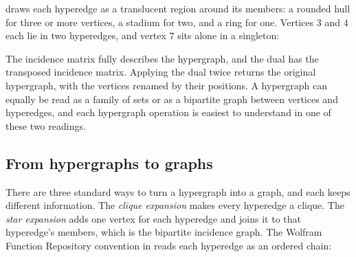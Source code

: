  draws each hyperedge as a translucent region around its
members: a rounded hull for three or more vertices, a stadium for two, and a
ring for one. Vertices \(3\) and \(4\) each lie in two hyperedges, and vertex
\(7\) sits alone in a singleton:



The incidence matrix fully describes the hypergraph, and the dual has the
transposed incidence matrix. Applying the dual twice returns the original
hypergraph, with the vertices renamed by their positions. A hypergraph can equally be read as a family of sets or as a
bipartite graph between vertices and hyperedges, and each hypergraph operation
is easiest to understand in one of these two readings.


\subsection{From hypergraphs to graphs}
\label{ssec:hyp-expansions}

There are three standard ways to turn a hypergraph into a graph, and each keeps
different information. The \emph{clique expansion} makes every hyperedge a
clique. The \emph{star expansion} adds one vertex for each hyperedge and joins
it to that hyperedge's members, which is the bipartite incidence graph. The
Wolfram Function Repository convention in  reads each
hyperedge as an ordered chain:

\begin{codepairs}
\end{codepairs}

